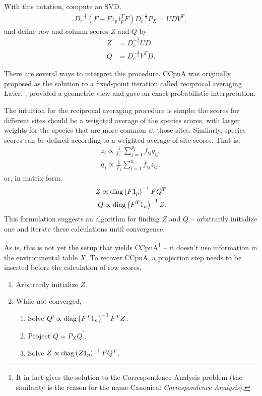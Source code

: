 \documentclass[14pt]{extarticle}
\begin{document}
With this notation, compute an SVD,
\begin{align*}
D_{r}^{-\frac{1}{2}}\left(F - F 1_{p}1_{p}^{T}F\right)D_{c}^{-\frac{1}{2}}P_{X}
= UDV^{T},
\end{align*}
and define row and column scores $Z$ and $Q$ by
\begin{align*}
  Z &= D_{r}^{-\frac{1}{2}} UD \\
  Q &= D_{c}^{-\frac{1}{2}}V^{T}D.
\end{align*}

There are several ways to interpret this procedure. CCpnA was originally
proposed as the solution to a fixed-point iteration called reciprocal averaging
\citep{ter1986canonical}. Later, \cite{greenacre1987geometric,
  greenacre1984theory}, provided a geometric view and \cite{zhu2005constrained}
gave an exact probabilistic interpretation.

The intuition for the reciprocal averaging procedure is simple: the scores for
different sites should be a weighted average of the species scores, with larger
weights for the species that are more common at those sites. Similarly, species
scores can be defined according to a weighted average of site scores. That is,
\begin{align*}
  z_{i} \propto \frac{1}{f_{i\cdot}}\sum_{j = 1}^{p_{1}}f_{ij}q_{ij} \\
  q_{j} \propto \frac{1}{f_{\cdot j}} \sum_{i = 1}^{n} f_{ij}z_{ij},
\end{align*}
or, in matrix form,
\begin{align*}
Z \propto \mathop\mathrm{diag}\left(F 1_{p}\right)^{-1} F Q^{T} \\
Q \propto \mathop\mathrm{diag}\left(F^{T} 1_{n}\right)^{-1} Z.
\end{align*}
This formulation suggests an algorithm for finding $Z$ and $Q$ -- arbitrarily
initialize one and iterate these calculations until convergence.

As is, this is not yet the setup that yields CCpnA\footnote{It in fact gives the
  solution to the Correspondence Analysis problem (the similarity is the reason
  for the name Canonical \textit{Correspondence Analysis}).} -- it doesn't use
information in the environmental table $X$. To recover CCpnA, a projection step
needs to be inserted before the calculation of row scores,
\begin{enumerate}
\item Arbitrarily initialize $Z$.
\item While not converged,
\begin{enumerate}
\item Solve $Q^{\prime} \propto \mathop\mathrm{diag}\left(F^{T}1_{n}\right)^{-1}F^{T}Z$.
\item Project $Q = P_{X}Q^{\prime}$.
\item Solve $Z \propto \mathop\mathrm{diag}\left(Z 1_{p}\right)^{-1} F Q^{T}$.
\end{enumerate}
\end{enumerate}
\end{document}
